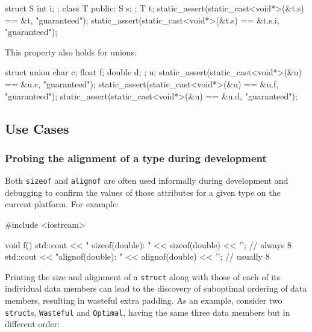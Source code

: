   \begin{emcppslisting}
struct S { int i; };                                                            
class T { public: S s; };                                                       
T t;                                                                            
static_assert(static_cast<void*>(&t.s) == &t, "guaranteed");                                                                             
static_assert(static_cast<void*>(&t.s) == &t.s.i, "guaranteed");
\end{emcppslisting}
      
\noindent This property also holds for unions:

  \begin{emcppslisting}
struct { union { char c; float f; double d; }; } u;                             
static_assert(static_cast<void*>(&u) == &u.c, "guaranteed");          
static_assert(static_cast<void*>(&u) == &u.f, "guaranteed");          
static_assert(static_cast<void*>(&u) == &u.d, "guaranteed");
\end{emcppslisting}
    

\subsection[Use Cases]{Use Cases}\label{use-cases}

\subsubsection[Probing the alignment of a type during development]{Probing the alignment of a type during development}\label{probing-the-alignment-of-a-type-during-development}

Both \lstinline!sizeof! and \lstinline!alignof! are often used informally
during development and debugging to confirm the values
of those attributes for a given type on the current platform. For
example:

\begin{emcppslisting}
#include <iostream>

void f()
{
    std::cout << " sizeof(double): " <<  sizeof(double) << '\n';  //  always 8
    std::cout << "alignof(double): " << alignof(double) << '\n';  // usually 8
}
\end{emcppslisting}
    
\noindent Printing the size and alignment of a \lstinline!struct! along with those of
each of its individual data members can lead to the discovery of
suboptimal ordering of data members, resulting in wasteful extra
padding. As an example, consider two \lstinline!struct!s,
\lstinline!Wasteful! and \lstinline!Optimal!, having the same three data members but
in different order:

